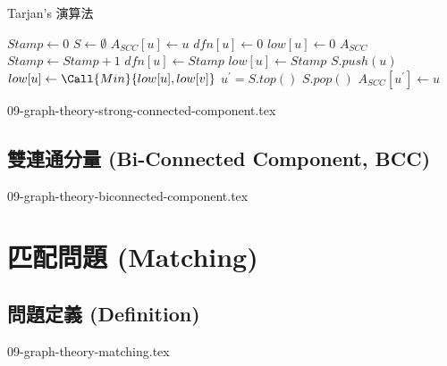 \documentclass[12pt,a4paper,oneside]{report}
\begin{document}
\begin{CJK}{UTF8}{bkai}
\begin{algorithm}
  \caption{Tarjan's 演算法}
  \label{algo:scc_tarjan}
  \begin{algorithmic}[1]
    \State $Stamp\gets{0}$
    \State $S\gets{\emptyset}$
      \State $A_{SCC}[u]\gets{u}$
      \State $dfn[u]\gets{0}$
      \State $low[u]\gets{0}$
    \EndFor
        \State {}
      \EndIf
    \EndFor
    \State \Return $A_{SCC}$
  \EndProcedure
  \State {}
    \State $Stamp\gets{Stamp+1}$
    \State $dfn[u]\gets{Stamp}$
    \State $low[u]\gets{Stamp}$
    \State $S.push(u)$
        \State {}
      \EndIf
        \State $low[u]\gets{\Call{Min}{low[u],low[v]}}$
      \EndIf
    \EndFor
      \Repeat
        \State $u^{'}=S.top()$
        \State $S.pop()$
        \State $A_{SCC}[u^{'}]\gets{u}$
    \EndIf
  \EndProcedure
  \end{algorithmic}
\end{algorithm}

{09-graph-theory-strong-connected-component.tex}

\subsection{雙連通分量 (Bi-Connected Component, BCC)}

{09-graph-theory-biconnected-component.tex}

\section{匹配問題 (Matching)}

\subsection{問題定義 (Definition)}

{09-graph-theory-matching.tex}


\end{CJK}
\end{document}

